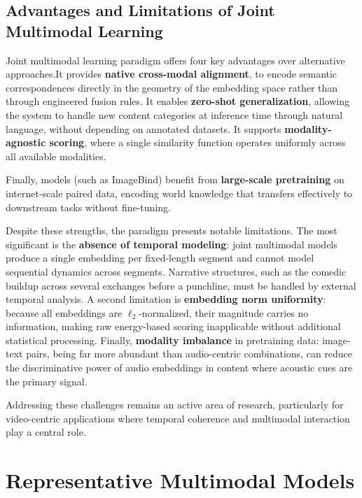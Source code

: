 \documentclass[12pt,a4paper,oneside,english]{book}
\begin{document}
\subsection{Advantages and Limitations  of Joint Multimodal Learning}
\label{subsec:jml_advantages_limitations}

Joint multimodal learning paradigm offers four key advantages over alternative approaches.It provides \textbf{native cross-modal alignment}, to encode semantic correspondences directly in the geometry of the embedding space rather than through engineered fusion rules.
It enables \textbf{zero-shot generalization}, allowing the system to handle new content categories at inference time through natural language, without depending on annotated datasets.
It supports \textbf{modality-agnostic scoring}, where a single similarity function operates uniformly across all available modalities.

Finally, models (such as ImageBind) benefit from \textbf{large-scale pretraining} on internet-scale paired data, encoding world knowledge that transfers effectively to downstream tasks without fine-tuning.

Despite these strengths, the paradigm presents notable limitations.
The most significant is the \textbf{absence of temporal modeling}: joint multimodal models produce a single embedding per fixed-length segment and cannot model sequential dynamics across segments.
Narrative structures, such as the comedic buildup across several exchanges before a punchline, must be handled by external temporal analysis.
A second limitation is \textbf{embedding norm uniformity}: because all embeddings are $\ell_2$-normalized, their magnitude carries no information, making raw energy-based scoring inapplicable without additional statistical processing.
Finally, \textbf{modality imbalance} in pretraining data: image-text pairs, being far more abundant than audio-centric combinations, can reduce the discriminative power of audio embeddings in content where acoustic cues are the primary signal.

Addressing these challenges remains an active area of research, particularly for video-centric applications where temporal coherence and multimodal interaction play a central role.

\section{Representative Multimodal Models}
\label{sec:multimodal_models}
\end{document}
